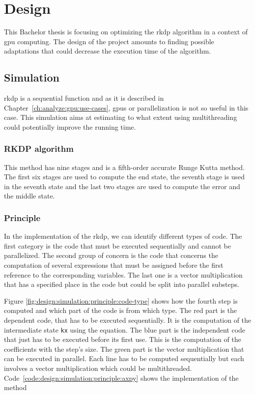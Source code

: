 \chapter{Design}
\label{ch:design}

This Bachelor thesis is focusing on optimizing the \acrlong{rkdp} algorithm
in a context of \acrshort{gpu} computing.
The design of the project amounts to finding possible adaptations that could
decrease the execution time of the algorithm.

\section{Simulation}
\label{ch:design:simulation}

\acrshort{rkdp} is a sequential function and as it is described in Chapter~\ref{ch:analyze:gpu:use-cases},
\acrshort{gpu}s or parallelization is not so useful in this case.
This simulation aims at estimating to what extent using multithreading could
potentially improve the running time.

\subsection{RKDP algorithm}
\label{ch:design:simulation:rkdp}

This method has nine stages and is a fifth-order accurate Runge Kutta method.
The first six stages are used to compute the end state, the seventh stage is used
in the seventh state and the last two stages are used to compute the error and the
middle state.

\subsection{Principle}
\label{ch:design:simulation:principle}

In the implementation of the \acrshort{rkdp}, we can identify different types of
code.
The first category is the code that must be executed sequentially and cannot be
parallelized.
The second group of concern is the code that concerns the computation of several
expressions that must be assigned before the first reference to the
corresponding variables.
The last one is a vector multiplication that has a specified place in the code
but could be split into parallel substeps.

Figure \ref{fig:design:simulation:principle:code-type} shows how the
fourth step is computed and which part of the code is from which type.
The red part is the dependent code, that has to be executed sequentially.
It is the computation of the intermediate state \texttt{kx} using the equation.
The blue part is the independent code that just has to be executed before its
first use. This is the computation of the coefficients with the step's size.
The green part is the vector multiplication that can be executed in parallel.
Each line has to be computed sequentially but each involves a vector
multiplication which could be multithreaded.
Code~\ref{code:design:simulation:principle:axpy} shows the implementation of the
method

